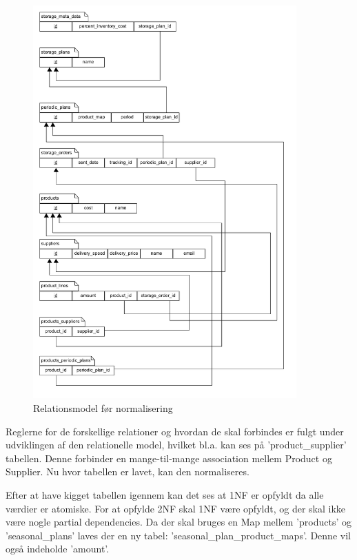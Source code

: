 \begin{figure}[H]
    \centering
    \includegraphics[width=0.9\textwidth]{figures/krav/relation_model_0th_normalization.png}
    \caption{Relationsmodel før normalisering}
    \label{fig:relational_model_0}
\end{figure}

Reglerne for de forskellige relationer og hvordan de skal forbindes er fulgt under udviklingen af den relationelle model, hvilket bl.a. kan ses på 'product\_supplier' tabellen. Denne forbinder en mange-til-mange association mellem Product og Supplier. 
Nu hvor tabellen er lavet, kan den normaliseres.

Efter at have kigget tabellen igennem kan det ses at 1NF er opfyldt da alle værdier er atomiske.
For at opfylde 2NF skal 1NF være opfyldt, og der skal ikke være nogle partial dependencies. Da der skal bruges en Map mellem 'products' og 'seasonal\_plans' laves der en ny tabel: 'seasonal\_plan\_product\_maps'. Denne vil også indeholde 'amount'.

